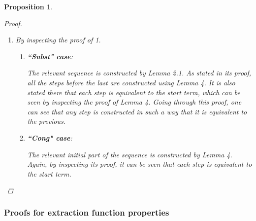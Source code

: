 \documentclass[11pt]{article} %
\newtheorem{proposition}{Proposition}
\begin{document}
\begin{proposition}
\begin{proof}
\begin{enumerate}
\begin{enumerate}
The desired sequence can be constructed as follows.

Terms immediately under $\mathcal{E}$ in its structure that are values in $prg$ but aren't values in $\langle prg \rangle$ need to be reduced to equivalent values first. For this, Lemma 4 can be applied multiple times to produce sequences that, starting with $\mathcal{E}[s^0]$ and always reducing the left-most such subterm, achieve exactly that. Thus we obtain an initial reduction $s \longrightarrow^*_{\langle prg \rangle} \widetilde{\mathcal{E}}[s^0]$ with $\widetilde{\mathcal{E}}[s^0] \sim \mathcal{E}[s^0]$.

By the induction hypothesis we have $s^0 \longrightarrow_{\langle prg \rangle} \widetilde{t^0}$, for a $\widetilde{t^0} \sim t^0$. By applying the congruence rule we get $\widetilde{\mathcal{E}}[s^0] \longrightarrow_{\langle prg \rangle} \widetilde{\mathcal{E}}[\widetilde{t^0}] \sim \mathcal{E}[\widetilde{t^0}] \sim \mathcal{E}[t^0]$.

\end{enumerate}

\item By inspecting the proof of 1.

\begin{enumerate}

\item \textbf{``Subst" case}:

The relevant sequence is constructed by Lemma 2.1. As stated in its proof, all the steps before the last are constructed using Lemma 4. It is also stated there that each step is equivalent to the start term, which can be seen by inspecting the proof of Lemma 4. Going through this proof, one can see that any step is constructed in such a way that it is equivalent to the previous.

\item \textbf{``Cong" case}:

The relevant initial part of the sequence is constructed by Lemma 4. Again, by inspecting its proof, it can be seen that each step is equivalent to the start term.

\end{enumerate}

\end{enumerate}

\end{proof}

\end{proposition}

\subsubsection{Proofs for extraction function properties}
\end{document}
